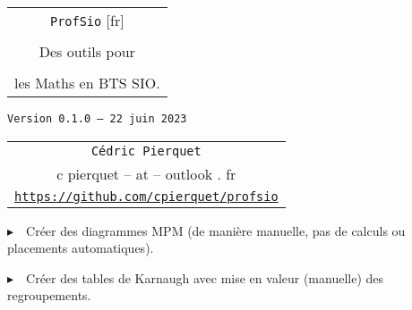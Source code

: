 \documentclass[french,a4paper,11pt]{article}
\def\TPversion{0.1.0}
\def\TPdate{22 juin 2023}
\begin{document}
\setlength{\aweboxleftmargin}{0.07\linewidth}
\setlength{\aweboxcontentwidth}{0.93\linewidth}
\setlength{\aweboxvskip}{8pt}

\pagestyle{fancy}

\thispagestyle{empty}

\vspace{2cm}

\begin{center}
	\begin{minipage}{0.75\linewidth}
	\begin{tcolorbox}[colframe=yellow,colback=yellow!15]
		\begin{center}
			\begin{tabular}{c}
				{\Huge \texttt{ProfSio} [fr]}\\
				\\
				{\LARGE Des outils pour} \\
				\\
				{\LARGE les Maths en BTS SIO.} \\
			\end{tabular}
			
			\bigskip
			
			{\small \texttt{Version \TPversion{} -- \TPdate}}
		\end{center}
	\end{tcolorbox}
\end{minipage}
\end{center}

\begin{center}
	\begin{tabular}{c}
	\texttt{Cédric Pierquet}\\
	{\ttfamily c pierquet -- at -- outlook . fr}\\
	\texttt{\url{https://github.com/cpierquet/profsio}}
\end{tabular}
\end{center}

\vspace{0.25cm}

{$\blacktriangleright$~~Créer des diagrammes MPM (de manière manuelle, pas de calculs ou placements automatiques).}

\vspace{0.25cm}

{$\blacktriangleright$~~Créer des tables de Karnaugh avec mise en valeur (manuelle) des regroupements.}

\vspace{1cm}
\end{document}
